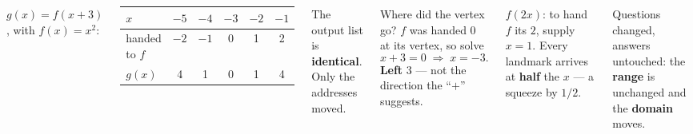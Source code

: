 \documentclass[aspectratio=169, 11pt]{beamer}
\begin{document}
\begin{frame}[t, plain]

  \begin{columns}[T, onlytextwidth]
      \(g(x) = f(x + 3)\), with \(f(x) = x^2\):

      \smallskip
      \begin{center}
      \renewcommand{\arraystretch}{1.3}
      \begin{tabular}{|l|c|c|c|c|c|}
      \hline
      \(x\) & \(-5\) & \(-4\) & \(-3\) & \(-2\) & \(-1\) \\
      \hline
      handed to \(f\) & \(-2\) & \(-1\) & 0 & 1 & 2 \\
      \hline
      \(g(x)\) & 4 & 1 & 0 & 1 & 4 \\
      \hline
      \end{tabular}
      \end{center}

      \medskip
      The output list is \textbf{identical}. Only the addresses moved.

      \begin{block}{Where did the vertex go?}
        \(f\) was handed \(0\) at its vertex, so solve
        \[ x + 3 = 0 \;\Longrightarrow\; x = -3. \]
        \textbf{Left} 3 --- not the direction the ``\(+\)'' suggests.
      \end{block}

      \medskip
      \(f(2x)\): to hand \(f\) its \(2\), supply \(x = 1\). Every landmark
      arrives at \textbf{half} the \(x\) --- a squeeze by \(1/2\).

      \smallskip
      Questions changed, answers untouched: the \textbf{range} is unchanged
      and the \textbf{domain} moves.
  \end{columns}
\end{frame}
\end{document}
